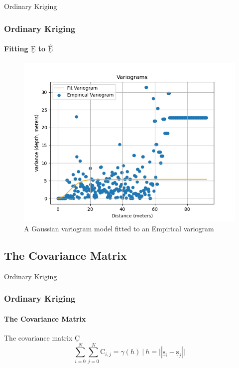 \documentclass[professionalfont,10pt]{beamer}
\begin{document}
	\begin{frame}[t]{Ordinary Kriging}
		\frametitle{Ordinary Kriging}
		\framesubtitle{Fitting $\underline{\text{E}}$ to $\hat{\underline{\text{E}}}$}
		\hskip-0.75cm
		\begin{minipage}[t]{0.2\linewidth}\vspace{-0.5cm}
			\tiny\tableofcontents[currentsection,currentsubsection,hideothersubsections,subsectionstyle=show/shaded]
		\end{minipage}
		\hfill%
		\begin{minipage}[t]{0.86\linewidth}\vspace{-0.5cm}
			\begin{figure}[t]
				\centering
				\captionsetup{width=0.9\textwidth}
				\includegraphics[width=\textwidth]{../images/fittingE.png}
				\caption{A Gaussian variogram model fitted to an Empirical variogram}
			\end{figure}
		\end{minipage}
		\vfill%
	\end{frame}
	
	\subsection{The Covariance Matrix}
	\begin{frame}[t]{Ordinary Kriging}
		\frametitle{Ordinary Kriging}
		\framesubtitle{The Covariance Matrix}
		\hskip-0.75cm
		\begin{minipage}[t]{0.2\linewidth}\vspace{-0.5cm}
			\tiny\tableofcontents[currentsection,currentsubsection,hideothersubsections,subsectionstyle=show/shaded]
		\end{minipage}
		\hfill%
		\begin{minipage}[t]{0.86\linewidth}\vspace{-0.5cm}
			The covariance matrix $\underline{\text{C}}$
			\begin{equation}
				\sum_{i=0}^{N}
					\sum_{j=0}^{N}
						\text{C}_{i,j}=\gamma(h) \: | \: h=||\underline{\text{s}}_i - \underline{\text{s}}_j||
			\end{equation}
		\end{minipage}
		\vfill%
	\end{frame}
\end{document}
